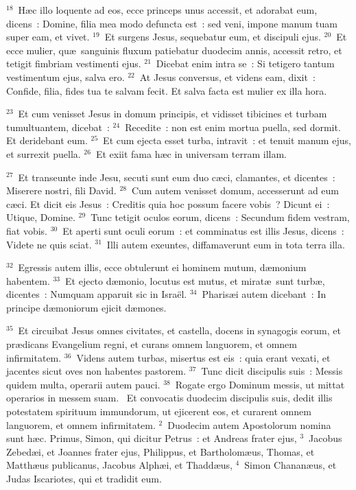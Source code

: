 ${}^{18}$~H\ae c illo loquente ad eos, ecce princeps unus accessit, et adorabat eum, dicens~: Domine, filia mea modo defuncta est~: sed veni, impone manum tuam super eam, et vivet.
${}^{19}$~Et surgens Jesus, sequebatur eum, et discipuli ejus.
${}^{20}$~Et ecce mulier, qu\ae\ sanguinis fluxum patiebatur duodecim annis, accessit retro, et tetigit fimbriam vestimenti ejus.
${}^{21}$~Dicebat enim intra se~: Si tetigero tantum vestimentum ejus, salva ero.
${}^{22}$~At Jesus conversus, et videns eam, dixit~: Confide, filia, fides tua te salvam fecit. Et salva facta est mulier ex illa hora.


${}^{23}$~Et cum venisset Jesus in domum principis, et vidisset tibicines et turbam tumultuantem, dicebat~:
${}^{24}$~Recedite~: non est enim mortua puella, sed dormit. Et deridebant eum.
${}^{25}$~Et cum ejecta esset turba, intravit~: et tenuit manum ejus, et surrexit puella.
${}^{26}$~Et exiit fama h\ae c in universam terram illam.


${}^{27}$~Et transeunte inde Jesu, secuti sunt eum duo c\ae ci, clamantes, et dicentes~: Miserere nostri, fili David.
${}^{28}$~Cum autem venisset domum, accesserunt ad eum c\ae ci. Et dicit eis Jesus~: Creditis quia hoc possum facere vobis~? Dicunt ei~: Utique, Domine.
${}^{29}$~Tunc tetigit oculos eorum, dicens~: Secundum fidem vestram, fiat vobis.
${}^{30}$~Et aperti sunt oculi eorum~: et comminatus est illis Jesus, dicens~: Videte ne quis sciat.
${}^{31}$~Illi autem exeuntes, diffamaverunt eum in tota terra illa.


${}^{32}$~Egressis autem illis, ecce obtulerunt ei hominem mutum, d\ae monium habentem.
${}^{33}$~Et ejecto d\ae monio, locutus est mutus, et mirat\ae\ sunt turb\ae , dicentes~: Numquam apparuit sic in Isra\"el.
${}^{34}$~Pharis\ae i autem dicebant~: In principe d\ae moniorum ejicit d\ae mones.


${}^{35}$~Et circuibat Jesus omnes civitates, et castella, docens in synagogis eorum, et pr\ae dicans Evangelium regni, et curans omnem languorem, et omnem infirmitatem.
${}^{36}$~Videns autem turbas, misertus est eis~: quia erant vexati, et jacentes sicut oves non habentes pastorem.
${}^{37}$~Tunc dicit discipulis suis~: Messis quidem multa, operarii autem pauci.
${}^{38}$~Rogate ergo Dominum messis, ut mittat operarios in messem suam.
~Et convocatis duodecim discipulis suis, dedit illis potestatem spirituum immundorum, ut ejicerent eos, et curarent omnem languorem, et omnem infirmitatem.
${}^{2}$~Duodecim autem Apostolorum nomina sunt h\ae c. Primus, Simon, qui dicitur Petrus~: et Andreas frater ejus,
${}^{3}$~Jacobus Zebed\ae i, et Joannes frater ejus, Philippus, et Bartholom\ae us, Thomas, et Matth\ae us publicanus, Jacobus Alph\ae i, et Thadd\ae us,
${}^{4}$~Simon Chanan\ae us, et Judas Iscariotes, qui et tradidit eum.



